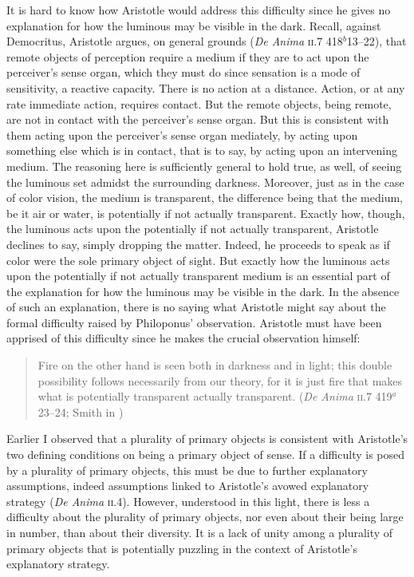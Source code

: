 It is hard to know how Aristotle would address this difficulty since he gives no explanation for how the luminous may be visible in the dark. Recall, against Democritus, Aristotle argues, on general grounds (\emph{De Anima} \textsc{ii}.7 418\( ^{b} \)13--22), that remote objects of perception require a medium if they are to act upon the perceiver's sense organ, which they must do since sensation is a mode of sensitivity, a reactive capacity. There is no action at a distance. Action, or at any rate immediate action, requires contact. But the remote objects, being remote, are not in contact with the perceiver's sense organ. But this is consistent with them acting upon the perceiver's sense organ mediately, by acting upon something else which is in contact, that is to say, by acting upon an intervening medium. The reasoning here is sufficiently general to hold true, as well, of seeing the luminous set admidst the surrounding darkness. Moreover, just as in the case of color vision, the medium is transparent, the difference being that the medium, be it air or water, is potentially if not actually transparent. Exactly how, though, the luminous acts upon the potentially if not actually transparent, Aristotle declines to say, simply dropping the matter. Indeed, he proceeds to speak as if color were the sole primary object of sight. But exactly how the luminous acts upon the potentially if not actually transparent medium is an essential part of the explanation for how the luminous may be visible in the dark. In the absence of such an explanation, there is no saying what Aristotle might say about the formal difficulty raised by Philoponus' observation. Aristotle must have been apprised of this difficulty since he makes the crucial observation himself:
\begin{quote}
	Fire on the other hand is seen both in darkness and in light; this double possibility follows necessarily from our theory, for it is just fire that makes what is potentially transparent actually transparent. (\emph{De Anima} \textsc{ii}.7 419\( ^{a} \)23--24; Smith in \citealt[34]{Barnes:1984uq})
\end{quote}

Earlier I observed that a plurality of primary objects is consistent with Aristotle's two defining conditions on being a primary object of sense. If a difficulty is posed by a plurality of primary objects, this must be due to further explanatory assumptions, indeed assumptions linked to Aristotle's avowed explanatory strategy (\emph{De Anima} \textsc{ii}.4). However, understood in this light, there is less a difficulty about the plurality of primary objects, nor even about their being large in number, than about their diversity. It is a lack of unity among a plurality of primary objects that is potentially puzzling in the context of Aristotle's explanatory strategy. 

